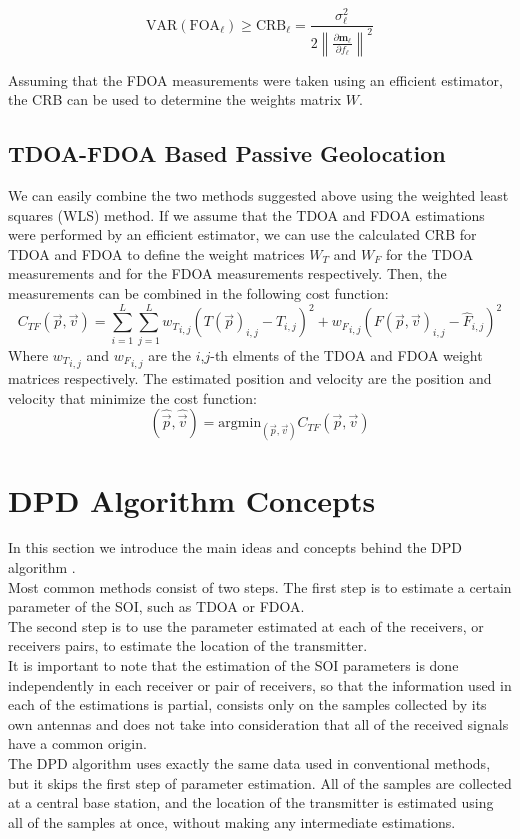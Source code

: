\begin{equation}
\text{VAR}(\text{FOA}_\ell)\geq\text{CRB}_\ell = \frac{\sigma_\ell^2}{2\left\|\frac{\partial \mathbf{m_\ell}}{\partial f_\ell}\right\|^2}
\end{equation}

Assuming that the FDOA measurements were taken using an efficient estimator, the CRB can be used to determine the weights matrix $W$.

\subsection{TDOA-FDOA Based Passive Geolocation}
\label{subsec:tdoa_fdoa}
We can easily combine the two methods suggested above using the weighted least squares (WLS) method.
If we assume that the TDOA and FDOA estimations were performed by an efficient estimator, we can use the calculated CRB for TDOA and FDOA to define the weight matrices $W_T$ and $W_F$ for the TDOA measurements and for the FDOA measurements respectively.
Then, the measurements can be combined in the following cost function:
\begin{equation}
C_{TF}(\vec{p},\vec{v}) = \sum_{i=1}^L \sum_{j=1}^L {w_T}_{i,j}(T(\vec{p})_{i,j}-\hat{T}_{i,j})^2+ {w_F}_{i,j}(F(\vec{p},\vec{v})_{i,j}-\hat{F}_{i,j})^2
\end{equation}
Where ${w_T}_{i,j}$ and ${w_F}_{i,j}$ are the $i$,$j$-th elments of the TDOA and FDOA weight matrices respectively.
The estimated position and velocity are the position and velocity that minimize the cost function:
\begin{equation}
(\hat{\vec{p}},\hat{\vec{v}}) = \text{argmin}_{(\vec{p},\vec{v})}C_{TF}(\vec{p},\vec{v})
\end{equation}

\section{DPD Algorithm Concepts}
In this section we introduce the main ideas and concepts behind the DPD algorithm \cite{dpd}.\\

Most common methods consist of two steps. The first step is to estimate a certain parameter of the
SOI, such as TDOA or FDOA. \\
The second step is to use the parameter estimated at each of the receivers, or receivers pairs, to estimate the location of the transmitter.\\
It is important to note that the estimation of the SOI parameters is done independently in each receiver or pair of receivers, so that the information used in each of the estimations is partial, consists only on the samples collected by its own antennas and does not take into consideration that all of the received signals have a common origin.\\
The DPD algorithm uses exactly the same data used in conventional methods, but it skips the first step of parameter estimation. All of the samples are collected at a central base station, and the location of the transmitter is estimated using all of the samples at once, without making any intermediate estimations.\\

